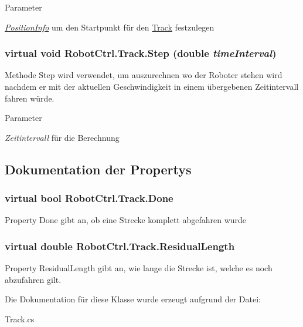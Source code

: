 \begin{DoxyParams}{Parameter}
\item[{\em \hyperlink{struct_robot_ctrl_1_1_position_info}{PositionInfo}}]um den Startpunkt für den \hyperlink{class_robot_ctrl_1_1_track}{Track} festzulegen \end{DoxyParams}
\hypertarget{class_robot_ctrl_1_1_track_a82386b9a49faa6a31d9706f39238f21b}{
\subsubsection[{Step}]{\setlength{\rightskip}{0pt plus 5cm}virtual void RobotCtrl.Track.Step (double {\em timeInterval})}}
\label{class_robot_ctrl_1_1_track_a82386b9a49faa6a31d9706f39238f21b}
Methode Step wird verwendet, um auszurechnen wo der Roboter stehen wird nachdem er mit der aktuellen Geschwindigkeit in einem \"{u}bergebenen Zeitintervall fahren würde.


\begin{DoxyParams}{Parameter}
\item[{\em Zeitintervall}]f\"{u}r die Berechnung \end{DoxyParams}


\subsection{Dokumentation der Propertys}
\hypertarget{class_robot_ctrl_1_1_track_ad1c4864f7171475914ef5c0111a0d901}{
\subsubsection[{Done}]{\setlength{\rightskip}{0pt plus 5cm}virtual bool RobotCtrl.Track.Done}}
\label{class_robot_ctrl_1_1_track_ad1c4864f7171475914ef5c0111a0d901}
Property Done gibt an, ob eine Strecke komplett abgefahren wurde \hypertarget{class_robot_ctrl_1_1_track_a4f01da358c21733d43ac272d3fb549cc}{
\subsubsection[{ResidualLength}]{\setlength{\rightskip}{0pt plus 5cm}virtual double RobotCtrl.Track.ResidualLength}}
\label{class_robot_ctrl_1_1_track_a4f01da358c21733d43ac272d3fb549cc}
Property ResidualLength gibt an, wie lange die Strecke ist, welche es noch abzufahren gilt. 

Die Dokumentation für diese Klasse wurde erzeugt aufgrund der Datei:\begin{DoxyCompactItemize}
\item 
Track.cs\end{DoxyCompactItemize}
